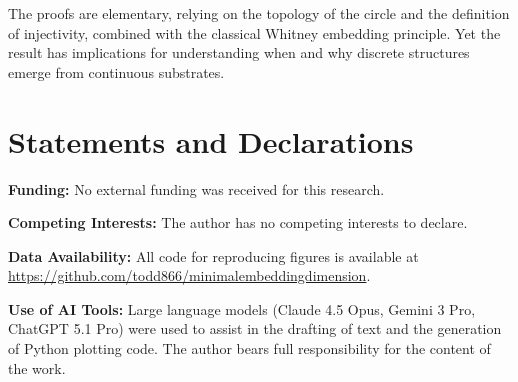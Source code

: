 \documentclass[12pt]{article}
\begin{document}
The proofs are elementary, relying on the topology of the circle and the definition of injectivity, combined with the classical Whitney embedding principle. Yet the result has implications for understanding when and why discrete structures emerge from continuous substrates.

\section*{Statements and Declarations}

\textbf{Funding:} No external funding was received for this research.

\textbf{Competing Interests:} The author has no competing interests to declare.

\textbf{Data Availability:} All code for reproducing figures is available at \url{https://github.com/todd866/minimalembeddingdimension}.

\textbf{Use of AI Tools:} Large language models (Claude 4.5 Opus, Gemini 3 Pro, ChatGPT 5.1 Pro) were used to assist in the drafting of text and the generation of Python plotting code. The author bears full responsibility for the content of the work.



\end{document}
